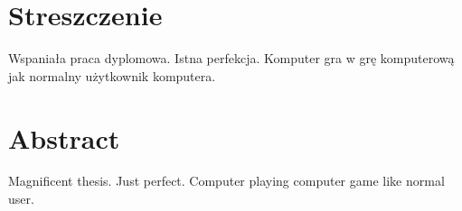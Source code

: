 \chapter*{Streszczenie}
Wspaniała praca dyplomowa. Istna perfekcja. Komputer gra w grę komputerową jak normalny użytkownik komputera.

\chapter*{Abstract}
Magnificent thesis. Just perfect. Computer playing computer game like normal user.
